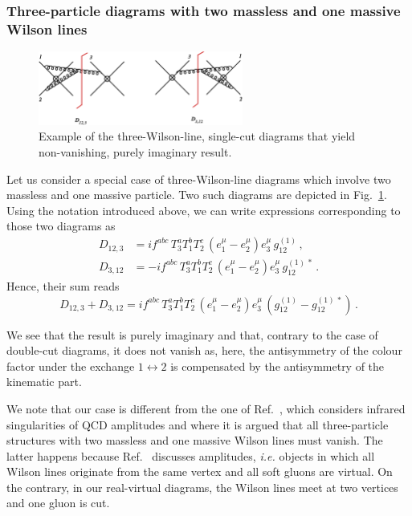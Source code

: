 \documentclass[a4paper,11pt]{article}
\newcommand{\ie}{{\it i.e. }}
\numberwithin{equation}{section}
\begin{document}
\subsubsection{Three-particle diagrams with two massless and one massive Wilson
lines }

\begin{figure}[t]
  \begin{center}
    \includegraphics[width=0.60\textwidth]{plots/sf-nnlo-1cut123.png}
  \end{center}
  \caption{Example of the three-Wilson-line, single-cut diagrams that yield
  non-vanishing, purely imaginary result.
  }
  \label{fig:diag123}
\end{figure}

Let us consider a special case of three-Wilson-line diagrams which involve two
massless and one massive particle. Two such diagrams are depicted in
Fig.~\ref{fig:diag123}.
%
Using the notation introduced above, we can write expressions corresponding to
those two diagrams as
%
\begin{align}
  D_{12,3} & = i f^{abc}\, T_3^a T_1^b T_2^c\, 
             \left(e_1^\mu-e_2^\mu\right) e_3^\mu\, g_{12}^{(1)}\,,
  \\[0.5em]
  D_{3,12} & = -i f^{abc}\, T_3^a T_1^b T_2^c\, 
             \left(e_1^\mu-e_2^\mu\right) e_3^\mu\, g_{12}^{(1)\,*}\,.
\end{align}
%
Hence, their sum reads
%
\begin{equation}
  D_{12,3}  + D_{3,12}  = i f^{abc}\, T_3^a T_1^b T_2^c\, 
                          \left(e_1^\mu-e_2^\mu\right) e_3^\mu\,
	                  \left(g_{12}^{(1)}-g_{12}^{(1)\,*}\right)\,.
\end{equation}

We see that the result is purely imaginary and that, contrary to the case of
double-cut diagrams, it does not vanish as, here, the
antisymmetry of the colour factor under the exchange $1 \leftrightarrow 2$ is
compensated by the antisymmetry of the kinematic part.

We note that our case is different from the one of Ref.~\cite{Becher:2009qa},
which considers infrared singularities of QCD amplitudes and where it is
argued that all three-particle structures with two massless and one massive
Wilson lines must vanish. The latter happens because Ref.~\cite{Becher:2009qa}
discusses amplitudes, \ie objects in which all Wilson lines originate from the
same vertex and all soft gluons are virtual. On the contrary, in our real-virtual
diagrams, the Wilson lines meet at two vertices and one gluon is cut.
\end{document}
